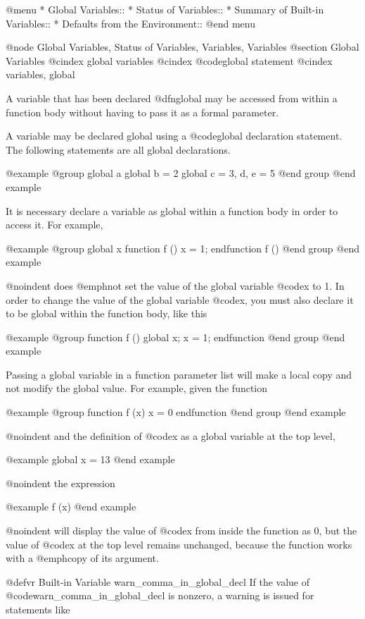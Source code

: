 @menu
* Global Variables::            
* Status of Variables::         
* Summary of Built-in Variables::  
* Defaults from the Environment::  
@end menu

@node Global Variables, Status of Variables, Variables, Variables
@section Global Variables
@cindex global variables
@cindex @code{global} statement
@cindex variables, global

A variable that has been declared @dfn{global} may be accessed from
within a function body without having to pass it as a formal parameter.

A variable may be declared global using a @code{global} declaration
statement.  The following statements are all global declarations.

@example
@group
global a
global b = 2
global c = 3, d, e = 5
@end group
@end example

It is necessary declare a variable as global within a function body in
order to access it.  For example,

@example
@group
global x
function f ()
  x = 1;
endfunction
f ()
@end group
@end example

@noindent
does @emph{not} set the value of the global variable @code{x} to 1.  In
order to change the value of the global variable @code{x}, you must also
declare it to be global within the function body, like this

@example
@group
function f ()
  global x;
  x = 1;
endfunction
@end group
@end example

Passing a global variable in a function parameter list will
make a local copy and not modify the global value.  For example, given
the function

@example
@group
function f (x)
  x = 0
endfunction
@end group
@end example

@noindent
and the definition of @code{x} as a global variable at the top level,

@example
global x = 13
@end example

@noindent
the expression

@example
f (x)
@end example

@noindent
will display the value of @code{x} from inside the function as 0,
but the value of @code{x} at the top level remains unchanged, because
the function works with a @emph{copy} of its argument.

@defvr {Built-in Variable} warn_comma_in_global_decl
If the value of @code{warn_comma_in_global_decl} is nonzero, a
warning is issued for statements like

